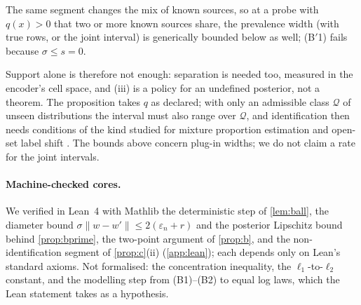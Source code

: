The same segment changes the mix of known sources, so at a probe with $q(x)>0$ that two or more known
sources share, the prevalence width (with true rows, or the joint interval) is generically bounded below
as well; (B$'$1) fails because $\sigma\le s=0$.

Support alone is therefore not enough: separation is needed too, measured in the encoder's cell
space, and (iii) is a policy for an undefined posterior, not a theorem. The proposition takes $q$ as
declared; with only an admissible class $\mathcal Q$ of unseen distributions the interval must also
range over $\mathcal Q$, and identification then needs conditions of the kind studied for mixture
proportion estimation and open-set label shift \citep{ramaswamy2016mixture,garg2022domain}. The
bounds above concern plug-in widths; we do not claim a rate for the joint intervals.

\paragraph{Machine-checked cores.} We verified in Lean~4 with Mathlib the deterministic step of
\cref{lem:ball}, the diameter bound $\sigma\lVert w-w'\rVert\le2(\varepsilon_n+r)$ and the posterior
Lipschitz bound behind \cref{prop:bprime}, the two-point argument of \cref{prop:b}, and the
non-identification segment of \cref{prop:c}(ii) (\cref{app:lean}); each depends only on Lean's
standard axioms. Not formalised: the concentration inequality, the $\ell_1$-to-$\ell_2$ constant, and
the modelling step from (B1)--(B2) to equal log laws, which the Lean statement takes as a hypothesis.
